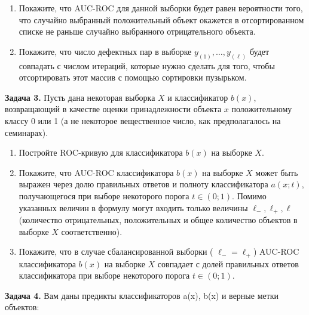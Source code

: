 \documentclass[12pt,fleqn]{article}
\begin{document}
\begin{enumerate}
  \item Покажите, что AUC-ROC для данной выборки будет равен вероятности того, что случайно выбранный положительный объект окажется в отсортированном списке не раньше случайно выбранного отрицательного объекта.
  \item Покажите, что число дефектных пар в выборке $y_{(1)}, \ldots, y_{(\ell)}$ будет совпадать с числом итераций, которые нужно сделать для того, чтобы отсортировать этот массив с помощью сортировки пузырьком.
\end{enumerate}

\textbf{Задача 3.} Пусть дана некоторая выборка $X$ и классификатор $b(x)$, возвращающий в качестве оценки принадлежности объекта $x$ положительному классу 0 или 1 (а не некоторое вещественное число, как предполагалось на семинарах).

\begin{enumerate}
  \item Постройте ROC-кривую для классификатора $b(x)$ на выборке $X$.
  \item Покажите, что AUC-ROC классификатора $b(x)$ на выборке $X$ может быть выражен через долю правильных ответов и полноту классификатора $a(x ; t)$, получающегося при выборе некоторого порога $t \in(0 ; 1)$. Помимо указанных величин в формулу могут входить только величины $\ell_{-}, \ell_{+}, \ell$ (количество отрицательных, положительных и общее количество объектов в выборке $X$ соответственно).
  \item Покажите, что в случае сбалансированной выборки ( $\ell_{-}=\ell_{+}$) AUC-ROC классификатора $b(x)$ на выборке $X$ совпадает с долей правильных ответов классификатора при выборе некоторого порога $t \in(0 ; 1)$.
\end{enumerate}

\textbf{Задача 4.} Вам даны предикты классификаторов a(x), b(x) и верные метки объектов:
\end{document}
